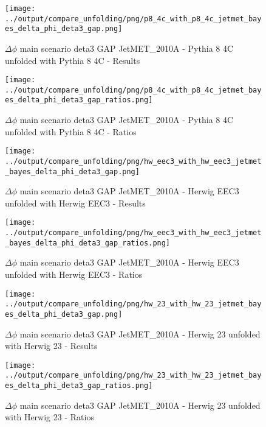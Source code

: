 \documentclass[11pt]{book}
\begin{document}
\begin{figure}[ht]
\centering
\texttt{[image: ../output/compare\_unfolding/png/p8\_4c\_with\_p8\_4c\_jetmet\_bayes\_delta\_phi\_deta3\_gap.png]}
\caption{$\Delta\phi$ main scenario deta3 GAP JetMET\_2010A - Pythia 8 4C unfolded with Pythia 8 4C - Results}
\label{p8_p8_jetmet_bayes_delta_phi_deta3_gap_a}
\end{figure}

\begin{figure}[ht]
\centering
\texttt{[image: ../output/compare\_unfolding/png/p8\_4c\_with\_p8\_4c\_jetmet\_bayes\_delta\_phi\_deta3\_gap\_ratios.png]}
\caption{$\Delta\phi$ main scenario deta3 GAP JetMET\_2010A - Pythia 8 4C unfolded with Pythia 8 4C - Ratios}
\label{p8_p8_jetmet_bayes_delta_phi_deta3_gap_b}
\end{figure}

\begin{figure}[ht]
\centering
\texttt{[image: ../output/compare\_unfolding/png/hw\_eec3\_with\_hw\_eec3\_jetmet\_bayes\_delta\_phi\_deta3\_gap.png]}
\caption{$\Delta\phi$ main scenario deta3 GAP JetMET\_2010A - Herwig EEC3 unfolded with Herwig EEC3 - Results}
\label{hw_eec3_hw_eec3_jetmet_bayes_delta_phi_deta3_gap_a}
\end{figure}

\begin{figure}[ht]
\centering
\texttt{[image: ../output/compare\_unfolding/png/hw\_eec3\_with\_hw\_eec3\_jetmet\_bayes\_delta\_phi\_deta3\_gap\_ratios.png]}
\caption{$\Delta\phi$ main scenario deta3 GAP JetMET\_2010A - Herwig EEC3 unfolded with Herwig EEC3 - Ratios}
\label{hw_eec3_hw_eec3_jetmet_bayes_delta_phi_deta3_gap_b}
\end{figure}

\begin{figure}[ht]
\centering
\texttt{[image: ../output/compare\_unfolding/png/hw\_23\_with\_hw\_23\_jetmet\_bayes\_delta\_phi\_deta3\_gap.png]}
\caption{$\Delta\phi$ main scenario deta3 GAP JetMET\_2010A - Herwig 23 unfolded with Herwig 23 - Results}
\label{hw_23_hw_23_jetmet_bayes_delta_phi_deta3_gap_a}
\end{figure}

\begin{figure}[ht]
\centering
\texttt{[image: ../output/compare\_unfolding/png/hw\_23\_with\_hw\_23\_jetmet\_bayes\_delta\_phi\_deta3\_gap\_ratios.png]}
\caption{$\Delta\phi$ main scenario deta3 GAP JetMET\_2010A - Herwig 23 unfolded with Herwig 23 - Ratios}
\label{hw_23_hw_23_jetmet_bayes_delta_phi_deta3_gap_b}
\end{figure}
\end{document}
